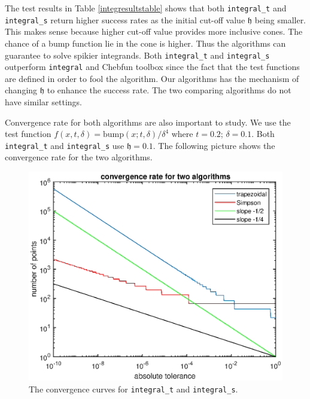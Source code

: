 \documentclass{iitthesis}
\theoremstyle{definition}
\theoremstyle{remark}
\begin{document}
The test results in Table \ref{integresultstable} shows that both {\tt integral\_t} and {\tt integral\_s} return higher success rates as the initial cut-off value $\mathfrak{h}$ being smaller. This makes sense because higher cut-off value provides more inclusive cones. The chance of a bump function lie in the cone is higher. Thus the algorithms can guarantee to solve spikier integrands.  Both {\tt integral\_t} and {\tt integral\_s} outperform {\tt integral} and Chebfun toolbox since the fact that the test functions are defined in order to fool the algorithm. Our algorithms has the mechanism of changing $\mathfrak{h}$ to enhance the success rate. The two comparing algorithms do not have similar settings.

Convergence rate for both algorithms are also important to study. We use the test function $f(x,t,\delta)= \text{bump}(x;t,\delta)/\delta^{4}$ where $t=0.2$; $\delta=0.1$. Both {\tt integral\_t} and {\tt integral\_s} use $\mathfrak{h}=0.1$. The following picture shows the convergence rate for the two algorithms.
\begin{figure}[ht]
\centering
\includegraphics[width=12.5cm]{converwithslope.eps}
\caption{The convergence curves for {\tt integral\_t} and {\tt integral\_s}. \label{fig:convergencerate}}
\end{figure}
\end{document}

